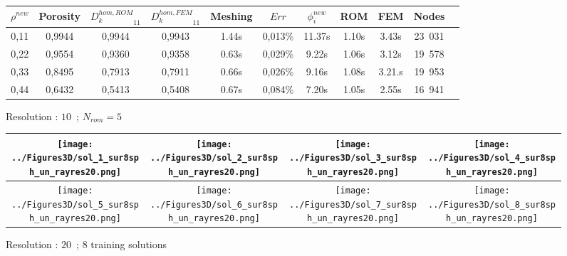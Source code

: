 {\etoile%

\begin{figure}[H]%
%
\begin{center}
\begin{tabular}{|c|c||c|c||c||c|c||c|c||c||c|}
\hline
\rowcolor{lightgray} $\rho^{new}$&Porosity&${D_k^{hom,ROM}}_{11}$&${D_k^{hom,FEM}}_{11}$&Meshing&$Err$&$\phi_i^{new}$&ROM&FEM&Nodes\\
\hline
0,11&0,9944&0,9944&0,9943&1.44s&0,013\%&11.37s&1.10s&3.43s&23\ 031\\
\hline
0,22&0,9554&0,9360&0,9358&0.63s&0,029\%&9.22s&1.06s&3.12s&19\ 578\\
\hline
0,33&0,8495&0,7913&0,7911&0.66s&0,026\%&9.16s&1.08s&3.21.s&19\ 953\\
\hline
0,44&0,6432&0,5413&0,5408&0.67s&0,084\%&7.20s&1.05s&2.55s&16\ 941\\
\hline
\end{tabular}
\end{center}
\caption{Resolution : $10$\ ; $N_{rom}=5$}
%
\end{figure}

\ligneinter

\begin{figure}[H]%
%
\begin{center}
\begin{tabular}{|c|c|c|c|}
\hline
\texttt{[image: ../Figures3D/sol\_1\_sur8sph\_un\_rayres20.png]}%
&%
\texttt{[image: ../Figures3D/sol\_2\_sur8sph\_un\_rayres20.png]}%
&%
\texttt{[image: ../Figures3D/sol\_3\_sur8sph\_un\_rayres20.png]}%
&%
\texttt{[image: ../Figures3D/sol\_4\_sur8sph\_un\_rayres20.png]}%
\\
\hline
\texttt{[image: ../Figures3D/sol\_5\_sur8sph\_un\_rayres20.png]}%
&%
\texttt{[image: ../Figures3D/sol\_6\_sur8sph\_un\_rayres20.png]}%
&%
\texttt{[image: ../Figures3D/sol\_7\_sur8sph\_un\_rayres20.png]}%
&%
\texttt{[image: ../Figures3D/sol\_8\_sur8sph\_un\_rayres20.png]}%
\\
\hline
\end{tabular}
\end{center}
\caption{Resolution : $20$\ ; $8$ training solutions}
%
\end{figure}


}
